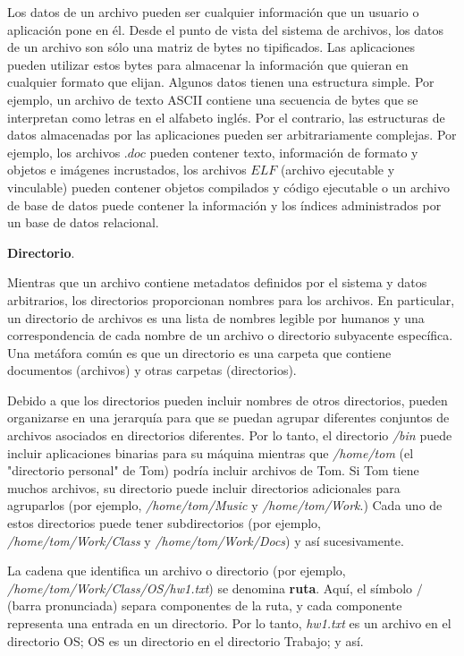 \documentclass[10pt]{book}
\begin{document}
Los datos de un archivo pueden ser cualquier información que un usuario o aplicación pone en él. Desde el punto de vista del sistema de archivos, los datos de un archivo son sólo una matriz de bytes no tipificados. Las aplicaciones pueden utilizar estos bytes para almacenar la información que quieran en cualquier formato que elijan. Algunos datos tienen una estructura simple. Por ejemplo, un archivo de texto ASCII contiene una secuencia de bytes que se interpretan como letras en el alfabeto inglés. Por el contrario, las estructuras de datos almacenadas por las aplicaciones pueden ser arbitrariamente complejas. Por ejemplo, los archivos $.doc$ pueden contener texto, información de formato y objetos e imágenes incrustados, los archivos $ELF$ (archivo ejecutable y vinculable) pueden contener objetos compilados y código ejecutable o un archivo de base de datos puede contener la información y los índices administrados por un base de datos relacional.

\textbf{Directorio}. 

Mientras que un archivo contiene metadatos definidos por el sistema y datos arbitrarios, los directorios proporcionan nombres para los archivos. En particular, un directorio de archivos es una lista de nombres legible por humanos y una correspondencia de cada nombre de un archivo o directorio subyacente específica. Una metáfora común es que un directorio es una carpeta que contiene documentos (archivos) y otras carpetas (directorios).

Debido a que los directorios pueden incluir nombres de otros directorios, pueden organizarse en una jerarquía para que se puedan agrupar diferentes conjuntos de archivos asociados en directorios diferentes. Por lo tanto, el directorio \textit{/bin} puede incluir aplicaciones binarias para su máquina mientras que \textit{/home/tom} (el "directorio personal" de Tom) podría incluir archivos de Tom. Si Tom tiene muchos archivos, su directorio puede incluir directorios adicionales para agruparlos (por ejemplo, \textit{/home/tom/Music} y \textit{/home/tom/Work}.) Cada uno de estos directorios puede tener subdirectorios (por ejemplo, \textit{/home/tom/Work/Class} y \textit{/home/tom/Work/Docs}) y así sucesivamente.

La cadena que identifica un archivo o directorio (por ejemplo, \textit{/home/tom/Work/Class/OS/hw1.txt}) se denomina \textbf{ruta}. Aquí, el símbolo $/$ (barra pronunciada) separa componentes de la ruta, y cada componente representa una entrada en un directorio. Por lo tanto, \textit{hw1.txt} es un archivo en el directorio OS; OS es un directorio en el directorio Trabajo; y así.
\end{document}
